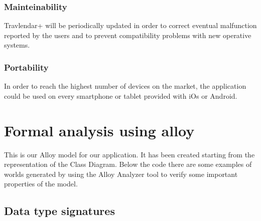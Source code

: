 \documentclass[12pt,titlepage]{article}
\begin{document}
\subsubsection{Mainteinability}\label{sec:mod1}
Travlendar+ will be periodically updated in order to correct eventual malfunction reported by the users and to prevent compatibility problems with new operative systems.
\subsubsection{Portability}\label{sec:mod1}
In order to reach the highest number of devices on the market, the application could be used on every smartphone or tablet provided with iOs or Android. 
\pagebreak

\section{Formal analysis using alloy}\label{sec:crit}
This is our Alloy model for our application. It has been created starting from the representation of the Class Diagram. Below the code there are some examples of worlds generated by using the Alloy Analyzer tool to verify some important properties of the model. 
\subsection{Data type signatures}\label{sec:crit}
\begin{figure}[h]
\end{figure}
\clearpage
\end{document}
